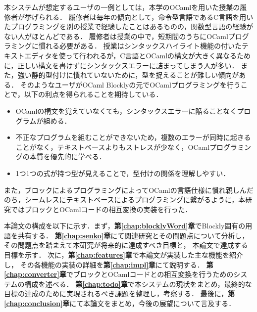本システムが想定するユーザの一例としては，本学のOCamlを用いた授業の履修者が挙げられる．
履修者は毎年の傾向として，命令型言語であるC言語を用いたプログラミングを別の授業で経験したことはあるものの，関数型言語の経験がない人がほとんどである．
履修者は授業の中で，短期間のうちにOCamlプログラミングに慣れる必要がある．
授業はシンタックスハイライト機能の付いたテキストエディタを使って行われるが，C言語とOCamlの構文が大きく異なるために，正しい構文を書けずにシンタックスエラーに詰まってしまう人が多い．
また，強い静的型付けに慣れていないために，型を捉えることが難しい傾向がある．
そのようなユーザがOCaml Blocklyの元でOCamlプログラミングを行うことで，以下の利点を得られることを期待している．
\begin{itemize}
  \item OCamlの構文を覚えていなくても，シンタックスエラーに陥ることなくプログラムが組める．
  \item 不正なプログラムを組むことができないため，複数のエラーが同時に起きることがなく，テキストベースよりもストレスが少なく，OCamlプログラミングの本質を優先的に学べる．
  \item 1つ1つの式が持つ型が見えることで，型付けの関係を理解しやすい．
\end{itemize}

また，ブロックによるプログラミングによってOCamlの言語仕様に慣れ親しんだのち，シームレスにテキストベースによるプログラミングに繋がるように，本研究ではブロックとOCamlコードの相互変換の実装を行った．

本論文の構成を以下に示す．まず，{\bf 第\ref{chap:blocklyWord}章}でBlockly固有の用語を共有する．
{\bf 第\ref{chap:senko}章}にて関連研究とその問題点について分析し，その問題点を踏まえて本研究が将来的に達成すべき目標と，
本論文で達成する目標を示す．
次に，{\bf 第\ref{chap:features}章}で本論文が実装した主な機能を紹介し，
その各機能の実装の詳細を{\bf 第\ref{chap:impl}章}にて説明する．
{\bf 第\ref{chap:converter}章}でブロックとOCamlコードとの相互変換を行うためのシステムの構成を述べる．
{\bf 第\ref{chap:todo}章}で本システムの現状をまとめ，最終的な目標の達成のために実現されるべき課題を整理し，考察する．
最後に，{\bf 第\ref{chap:conclusion}章}にて本論文をまとめ，今後の展望について言及する．
